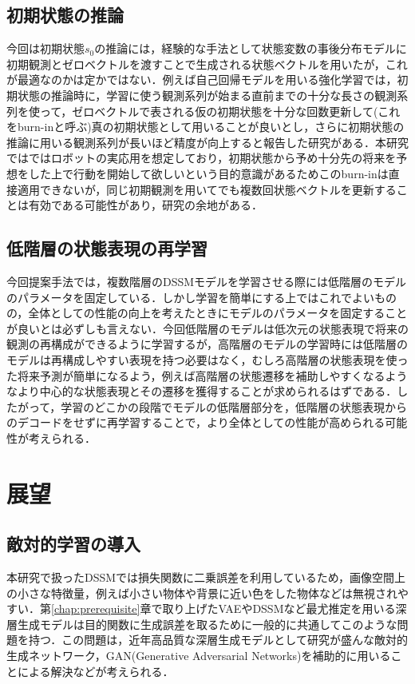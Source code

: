 \subsection{初期状態の推論}
今回は初期状態$s_0$の推論には，経験的な手法として状態変数の事後分布モデルに初期観測とゼロベクトルを渡すことで生成される状態ベクトルを用いたが，これが最適なのかは定かではない．例えば自己回帰モデルを用いる強化学習\cite{kapturowski2018recurrent}では，初期状態の推論時に，学習に使う観測系列が始まる直前までの十分な長さの観測系列を使って，ゼロベクトルで表される仮の初期状態を十分な回数更新して(これをburn-inと呼ぶ)真の初期状態として用いることが良いとし，さらに初期状態の推論に用いる観測系列が長いほど精度が向上すると報告した研究がある\cite{kapturowski2018recurrent}．本研究ではではロボットの実応用を想定しており，初期状態から予め十分先の将来を予想をした上で行動を開始して欲しいという目的意識があるためこのburn-inは直接適用できないが，同じ初期観測を用いてでも複数回状態ベクトルを更新することは有効である可能性があり，研究の余地がある．

\subsection{低階層の状態表現の再学習}
今回提案手法では，複数階層のDSSMモデルを学習させる際には低階層のモデルのパラメータを固定している．しかし学習を簡単にする上ではこれでよいものの，全体としての性能の向上を考えたときにモデルのパラメータを固定することが良いとは必ずしも言えない．今回低階層のモデルは低次元の状態表現で将来の観測の再構成ができるように学習するが，高階層のモデルの学習時には低階層のモデルは再構成しやすい表現を持つ必要はなく，むしろ高階層の状態表現を使った将来予測が簡単になるよう，例えば高階層の状態遷移を補助しやすくなるようなより中心的な状態表現とその遷移を獲得することが求められるはずである．したがって，学習のどこかの段階でモデルの低階層部分を，低階層の状態表現からのデコードをせずに再学習することで，より全体としての性能が高められる可能性が考えられる．

\section{展望}
\subsection{敵対的学習の導入}
本研究で扱ったDSSMでは損失関数に二乗誤差を利用しているため，画像空間上の小さな特徴量，例えば小さい物体や背景に近い色をした物体などは無視されやすい．第\ref{chap:prerequisite}章で取り上げたVAEやDSSMなど最尤推定を用いる深層生成モデルは目的関数に生成誤差を取るために一般的に共通してこのような問題を持つ．この問題は，近年高品質な深層生成モデルとして研究が盛んな敵対的生成ネットワーク，GAN(Generative Adversarial Networks)\cite{goodfellow2014generative}を補助的に用いることによる解決などが考えられる．

